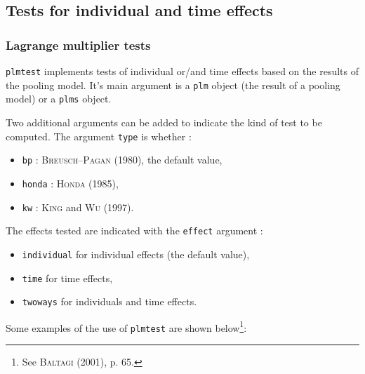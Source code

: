 \documentclass{article}
\begin{document}
\subsection{Tests for individual and time effects}



\subsubsection{Lagrange multiplier tests}

\texttt{plmtest} implements tests of individual or/and time effects  based on the results
of the pooling model. It's main argument is a
\texttt{plm} object (the result of a pooling model) or a
\texttt{plms} object.

Two additional arguments can be added to indicate the kind of test to
be computed. The argument \texttt{type} is whether :

\begin{itemize}
\item \texttt{bp} : \textsc{Breusch--Pagan} (1980), the default value,
\item \texttt{honda} : \textsc{Honda} (1985),
\item \texttt{kw} : \textsc{King} and \textsc{Wu} (1997).
\end{itemize}

The effects tested are indicated with the  \texttt{effect} argument :

\begin{itemize}
\item \texttt{individual} for individual effects  (the default value),
\item \texttt{time} for time effects,
\item \texttt{twoways} for individuals and time effects.
\end{itemize}

Some examples of the use of \texttt{plmtest} are shown below\footnote{See \textsc{Baltagi} (2001), p. 65.}:
\end{document}
